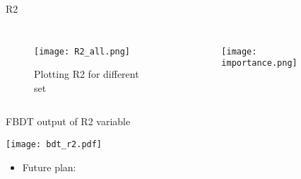 \documentclass[12pt]{beamer}
\begin{document}
\begin{frame}[t]{R2}

			\begin{columns}
				\begin{figure}
				\vspace{-1cm}
				\texttt{[image: R2\_all.png]}
				\caption{Plotting R2 for different set}
				\end{figure}			
			\begin{figure}
				\vspace{-0.8cm}
				\texttt{[image: importance.png]}
			\end{figure}
		\end{columns}

\end{frame}

\begin{frame}[t]{FBDT output of R2 variable}

	\vspace{-0.3cm}
				\hspace{-0.1cm} 
				\texttt{[image: bdt\_r2.pdf]}
	\begin{scriptsize}
		\vspace{-0.6cm}
		\begin{itemize}
			\item Future plan:

				\begin{itemize}
				\end{itemize}

		\end{itemize}
	\end{scriptsize}
\end{frame}
\end{document}

